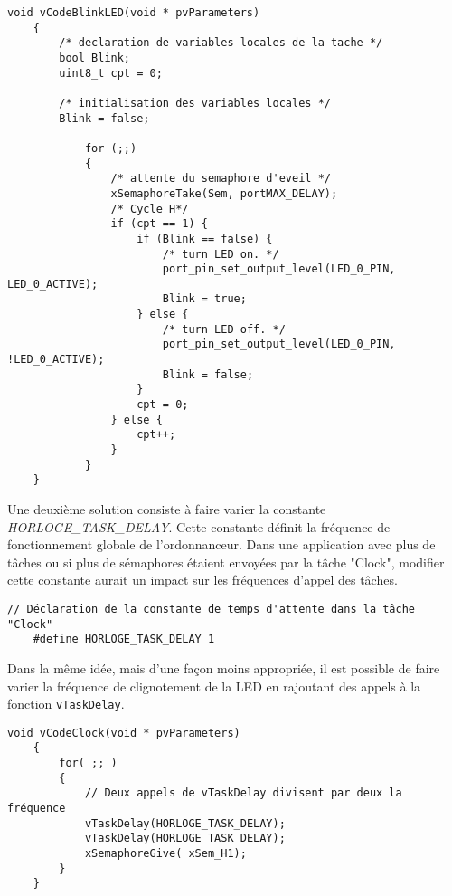 \begin{lstlisting}[style=CStyle]
    void vCodeBlinkLED(void * pvParameters) 
    { 
        /* declaration de variables locales de la tache */ 
        bool Blink;
        uint8_t cpt = 0;
        
        /* initialisation des variables locales */ 
        Blink = false;
        
            for (;;) 
            { 
                /* attente du semaphore d'eveil */ 
                xSemaphoreTake(Sem, portMAX_DELAY); 
                /* Cycle H*/ 
                if (cpt == 1) {
                    if (Blink == false) {
                        /* turn LED on. */
                        port_pin_set_output_level(LED_0_PIN, LED_0_ACTIVE);
                        Blink = true;
                    } else {
                        /* turn LED off. */
                        port_pin_set_output_level(LED_0_PIN, !LED_0_ACTIVE);
                        Blink = false;
                    }
                    cpt = 0;
                } else {
                    cpt++;
                }
            } 
    } 
\end{lstlisting}

Une deuxième solution consiste à faire varier la constante \textit{HORLOGE\_TASK\_DELAY}.
Cette constante définit la fréquence de fonctionnement globale de l'ordonnanceur.
Dans une application avec plus de tâches ou si plus de sémaphores étaient envoyées par la tâche "Clock", modifier cette constante aurait un impact sur les fréquences d'appel des tâches.

\begin{lstlisting}[style=CStyle]
    // Déclaration de la constante de temps d'attente dans la tâche "Clock"
    #define HORLOGE_TASK_DELAY 1
\end{lstlisting}

Dans la même idée, mais d'une façon moins appropriée, il est possible de faire varier la fréquence de clignotement de la LED en rajoutant des appels à la fonction \texttt{vTaskDelay}.

\begin{lstlisting}[style=CStyle]
    void vCodeClock(void * pvParameters)
    {
        for( ;; )
        {
            // Deux appels de vTaskDelay divisent par deux la fréquence
            vTaskDelay(HORLOGE_TASK_DELAY);
            vTaskDelay(HORLOGE_TASK_DELAY);
            xSemaphoreGive( xSem_H1);
        }
    }
\end{lstlisting}

